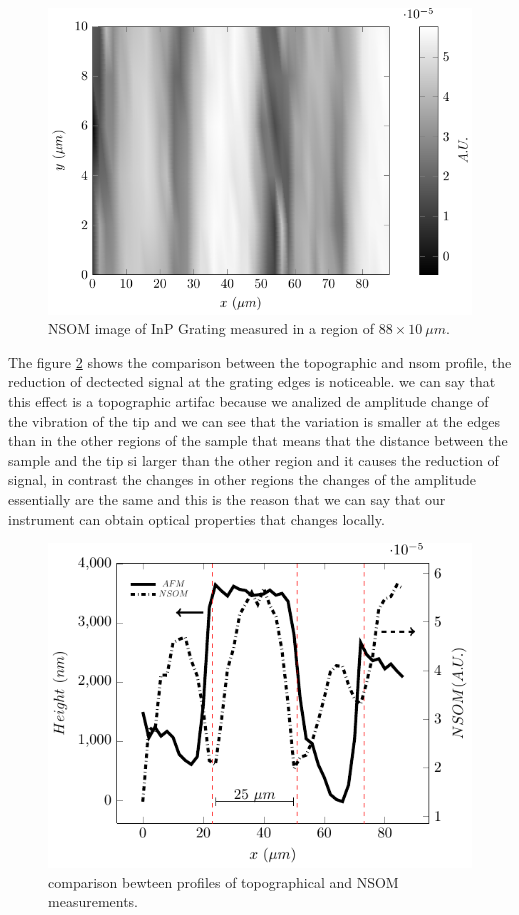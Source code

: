\documentclass[reprint,aps,prb,citeautoscript,altaffilletter]{revtex4-2}
\begin{document}
	\begin{figure}[!hbt]
		\centering
		\includegraphics[scale=0.6]{figures/result/nsomImag/nsomImag.pdf}

		\caption{NSOM image of InP Grating measured in a region of $88 \times 10 ~ \mu m$.}
		\label{fig:afmsom}
	\end{figure}

	The figure \ref{fig:comp} shows the comparison between the topographic and nsom profile,  the reduction of dectected signal at the grating edges  is noticeable. we can say that this effect is a topographic artifac because we analized de amplitude change of the vibration of the tip and we can see that the variation is smaller 
	at the edges than in the other regions of the sample that means that the distance between the sample and the tip si larger than the other region and it causes the reduction of signal, in contrast the changes in other regions the changes of the amplitude essentially are the same and this is the reason that we can say that our instrument can obtain 
	optical properties that changes locally.
	
	\begin{figure}[!hbt]
		\centering
		\includegraphics[scale=0.65]{figures/result/compProf/compafmnsom.pdf}

		\caption{comparison bewteen profiles of topographical and NSOM measurements.}
		\label{fig:comp}
	\end{figure}
\end{document}
